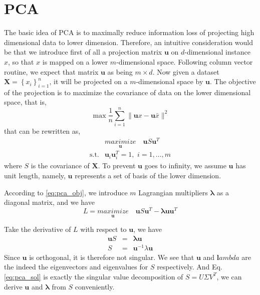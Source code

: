 \documentclass{article}
\newcommand{\vct}[1]{\ensuremath{\boldsymbol{#1}}} %
\begin{document}
\section{PCA}
The basic idea of PCA is to maximally reduce information loss of projecting high dimensional data to lower dimension. Therefore, an intuitive consideration would be that we introduce first of all a projection matrix $\vct u$ on $d$-dimensional instance $x$, so that $x$ is mapped on a lower $m$-dimensional space. Following column vector routine, we expect that matrix $\vct u$ as being $m \times d$. Now given a dataset $ \vct X = \left\{  x_i\right\}_{i=1}^{n}$, it will be projected on a $ m $-dimensional space by $\vct u$. The objective of the projection is to maximize the covariance of data on the lower dimensional space, that is,
\[
	\max \dfrac{1}{n}\sum_{i=1}^{n}\|\vct ux - \vct u\bar{x}\|^2
\]
that can be rewritten as,
\begin{eqnarray}
	& \underset{\vct u}{\textit{maximize}}\quad \vct u S \vct u^T \nonumber \\
	\text{s.t.} & \vct u_i\vct u_i^T = 1, \,\, i=1,\ldots,m
	\label{eq:pca_obj}
\end{eqnarray}
where $S$ is the covariance of $\vct X$. To prevent $\vct u$ goes to infinity, we assume $\vct u$ has unit length, namely, $\vct u$ represents a set of basis of the lower dimension.

According to \eqref{eq:pca_obj}, we introduce $m$ Lagrangian multipliers $\vct \lambda$ as a diagonal matrix, and we have
\[ L = \underset{\vct u}{\textit{maximize}}\quad \vct u S \vct u^T - \vct\lambda \vct u\vct u^T \]

Take the derivative of $L$ with respect to $\vct u$, we have
\begin{eqnarray}
	\vct uS & = & \vct\lambda\vct u \nonumber \\
	S & = & \vct u^{-1}\lambda\vct u
	\label{eq:pca_sol}
\end{eqnarray}
Since $\vct u$ is orthogonal, it is therefore not singular. We see that $\vct u$ and $\vct lambda$ are the indeed the eigenvectors and eigenvalues for $S$ respectively. And Eq.\eqref{eq:pca_sol} is exactly the singular value decomposition of $S=U\Sigma V^T$, we can derive $\vct u$ and $ \vct{\lambda} $ from $S$ conveniently.



\end{document}

